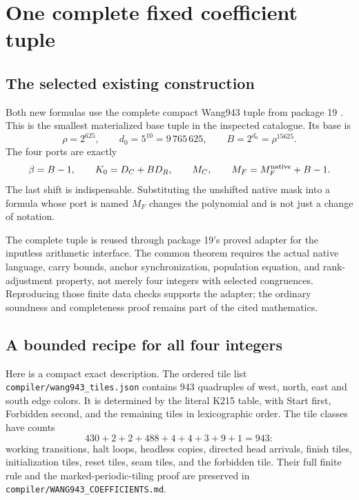 \section{One complete fixed coefficient tuple}
\label{sec:coefficients}

\subsection{The selected existing construction}
Both new formulas use the complete compact Wang943 tuple from package 19
\cite{p19}. This is the smallest materialized base tuple in the inspected
catalogue. Its base is
\[
 \rho=2^{625},\qquad d_0=5^{10}=9\,765\,625,\qquad
 B=2^{d_0}=\rho^{15625}.
\]
The four ports are exactly
\begin{equation}
 \beta=B-1,\qquad K_0=D_C+BD_R,\qquad M_C,
 \qquad M_F=M_F^{\rm native}+B-1.
 \label{eq:tuple}
\end{equation}
The last shift is indispensable. Substituting the unshifted native mask
into a formula whose port is named $M_F$ changes the polynomial and is not
just a change of notation.

The complete tuple is reused through package 19's proved adapter for the
inputless arithmetic interface. The common theorem requires the actual
native language, carry bounds, anchor synchronization, population equation,
and rank-adjustment property, not merely four integers with selected
congruences. Reproducing those finite data checks supports the adapter;
the ordinary soundness and completeness proof remains part of the cited
mathematics.

\subsection{A bounded recipe for all four integers}
Here is a compact exact description. The ordered tile list
\texttt{compiler/wang943\_tiles.json} contains 943 quadruples of west,
north, east and south edge colors. It is determined by the literal K215
table, with Start first, Forbidden second, and the remaining tiles in
lexicographic order. The tile classes have counts
\[
 430+2+2+488+4+4+3+9+1=943:
\]
working transitions, halt loops, headless copies, directed head arrivals,
finish tiles, initialization tiles, reset tiles, seam tiles, and the
forbidden tile. Their full finite rule and the marked-periodic-tiling proof
are preserved in \texttt{compiler/WANG943\_COEFFICIENTS.md}.


